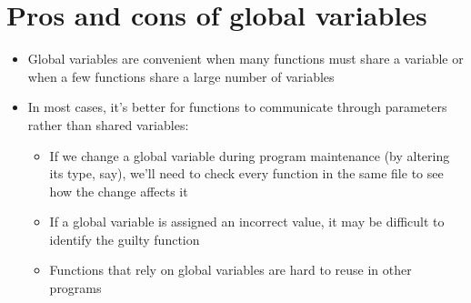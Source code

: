 \documentclass{article}
\begin{document}
\section{Pros and cons of global variables}
\begin{itemize}
\item Global variables are convenient when many functions must share a variable or when a few functions share a large number of variables
\item In most cases, it's better for functions to communicate through parameters rather than shared variables:
\begin{itemize}
\item If we change a global variable during program maintenance (by altering its type, say), we'll need to check every function in the same file to see how the change affects it
\item If a global variable is assigned an incorrect value, it may be difficult to identify the guilty function
\item Functions that rely on global variables are hard to reuse in other programs
\end{itemize}
\end{itemize}
\end{document}
